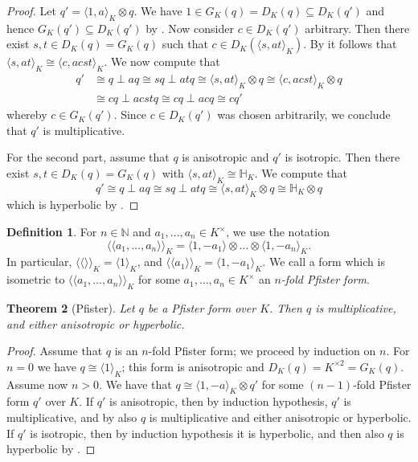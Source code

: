 \documentclass[12pt, leqno, british]{amsart}
\theoremstyle{definition}
\newtheorem{defi}{Definition}[subsection]
\theoremstyle{plain}
\newtheorem{thm}[defi]{Theorem}
\theoremstyle{remark}
\newcommand{\mbb}{\mathbb}
\newcommand{\nat}{\mbb N}
\newcommand{\llangle}{\langle\!\langle}
\newcommand{\rrangle}{\rangle\!\rangle}
\begin{document}
\begin{proof}
Let $q' = \langle 1, a \rangle_K \otimes q$. We have $1 \in G_K(q) = D_K(q) \subseteq D_K(q')$ and hence $G_K(q') \subseteq D_K(q')$ by .
Now consider $c \in D_K(q')$ arbitrary.
Then there exist $s, t \in D_K(q) = G_K(q)$ such that $c \in D_K(\langle s, at \rangle_K)$.
By  it follows that $\langle s, at \rangle_K \cong \langle c, acst \rangle_K$.
We now compute that
\begin{align*}
q' &\cong q \perp a q \cong sq \perp atq \cong \langle s, at \rangle_K \otimes q \cong \langle c, acst \rangle_K \otimes q \\
&\cong cq \perp acstq \cong cq \perp acq \cong cq'
\end{align*}
whereby $c \in G_K(q')$.
Since $c \in D_K(q')$ was chosen arbitrarily, we conclude that $q'$ is multiplicative.

For the second part, assume that $q$ is anisotropic and $q'$ is isotropic.
Then there exist $s, t \in D_K(q) = G_K(q)$ with $\langle s, at \rangle_K \cong \mbb{H}_K$.
We compute that
$$ q' \cong q \perp aq \cong sq \perp atq \cong \langle s, at \rangle_K \otimes q \cong \mbb{H}_K \otimes q $$
which is hyperbolic by .
\end{proof}
\begin{defi}
For $n \in \nat$ and $a_1, \ldots, a_n \in K^\times$, we use the notation
$$ \llangle a_1, \ldots, a_n \rrangle_K = \langle 1, -a_1 \rangle \otimes \ldots \otimes \langle 1, -a_n \rangle_K. $$
In particular, $\llangle \rrangle_K = \langle 1 \rangle_K$, and $\llangle a_1 \rrangle_K = \langle 1, -a_1 \rangle_K$.
We call a form which is isometric to $\llangle a_1, \ldots, a_n \rrangle_K$ for some $a_1, \ldots, a_n \in K^\times$ an \emph{$n$-fold Pfister form}.
\end{defi}
\begin{thm}[Pfister]\label{T:Pfister-forms}
Let $q$ be a Pfister form over $K$.
Then $q$ is multiplicative, and either anisotropic or hyperbolic.
\end{thm}
\begin{proof}
Assume that $q$ is an $n$-fold Pfister form; we proceed by induction on $n$.
For $n = 0$ we have $q \cong \langle 1 \rangle_K$; this form is anisotropic and $D_K(q) = K^{\times 2} = G_K(q)$.
Assume now $n > 0$.
We have that $q \cong \langle 1, -a \rangle_K \otimes q'$ for some $(n-1)$-fold Pfister form $q'$ over $K$.
If $q'$ is anisotropic, then by induction hypothesis, $q'$ is multiplicative, and by  also $q$ is multiplicative and either anisotropic or hyperbolic.
If $q'$ is isotropic, then by induction hypothesis it is hyperbolic, and then also $q$ is hyperbolic by .
\end{proof}
\end{document}
